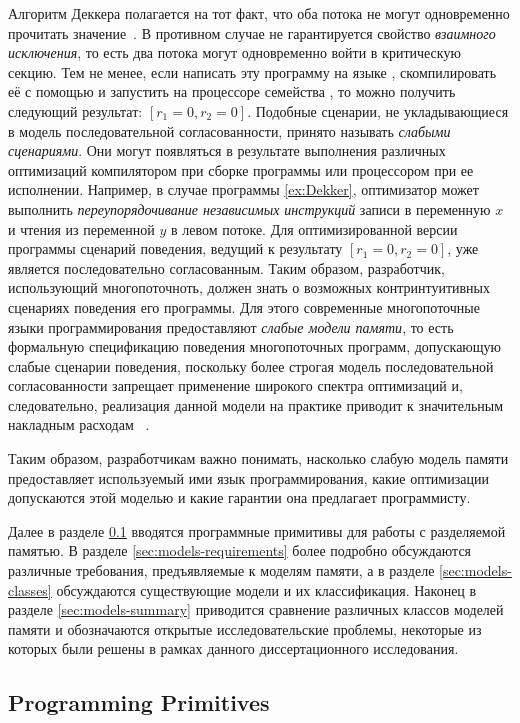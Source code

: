 Алгоритм Деккера полагается на тот факт, что оба 
потока не могут одновременно прочитать значение~.
В противном случае не гарантируется свойство \emph{взаимного исключения}, 
то есть два потока могут одновременно войти в критическую секцию. 
Тем не менее, если написать эту программу на языке \CLANG, скомпилировать её с помощью \GCC
и запустить  на процессоре семейства \IntelX, то
можно получить следующий результат:  ${[r_1=0,r_2=0]}$.
Подобные сценарии, 
не укладывающиеся в модель последовательной согласованности, 
принято называть \emph{слабыми сценариями}.
Они могут появляться 
в результате выполнения различных оптимизаций 
компилятором при сборке программы или процессором при ее исполнении. 
Например, в случае программы \ref{ex:Dekker}, оптимизатор может выполнить 
\emph{переупорядочивание независимых инструкций} 
записи в переменную $x$ и чтения из переменной $y$ в левом потоке.
Для оптимизированной версии программы сценарий поведения, 
ведущий к результату ${[r_1=0, r_2=0]}$, уже является последовательно согласованным. 
Таким образом, разработчик, использующий многопоточноть, должен знать о возможных контринтуитивных сценариях поведения его программы.   
Для этого современные многопоточные языки программирования 
предоставляют \emph{слабые модели памяти},
то есть формальную спецификацию  поведения многопоточных программ, 
допускающую слабые сценарии поведения,
поскольку более строгая модель последовательной согласованности
запрещает применение широкого спектра оптимизаций
и, следовательно, реализация данной модели на практике
приводит к значительным накладным расходам%
~\cite{Marino-al:PLDI11,Singh-al:ISCA12,Liu-al:OOPSLA17,Liu-al:PLDI19}. 


Таким образом, разработчикам важно понимать, насколько слабую модель памяти
предоставляет используемый ими язык программирования, какие оптимизации 
допускаются этой моделью и какие гарантии 
она предлагает программисту. 

Далее в разделе \ref{sec:models-primitives} 
вводятся программные примитивы для работы с разделяемой памятью. 
В разделе \ref{sec:models-requirements} более подробно обсуждаются 
различные требования, предъявляемые к моделям памяти, 
а в разделе \ref{sec:models-classes} обсуждаются существующие модели и их классификация. 
Наконец в разделе \ref{sec:models-summary} приводится сравнение различных 
классов моделей памяти и обозначаются открытые исследовательские проблемы, 
некоторые из которых были решены в рамках данного 
диссертационного исследования. 

\subsection{Programming Primitives}
\label{sec:models-primitives}

